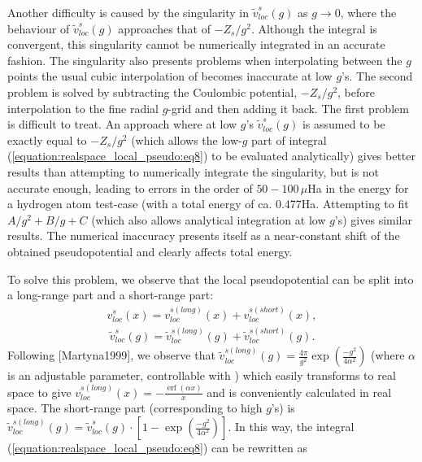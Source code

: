 \documentclass[letterpaper,10pt,english]{sphinxmanual}
\begin{document}
Another difficulty is caused by the singularity in
\({\tilde{v}^s_{loc}\left(g\right)}\) as \(g\to0\), where the
behaviour of \({\tilde{v}^s_{loc}\left(g\right)}\) approaches that
of \(-Z_s/g^2\). Although the integral is convergent, this
singularity cannot be numerically integrated in an accurate fashion. The
singularity also presents problems when interpolating between the
\(g\) points \textendash{} the usual cubic interpolation of
 becomes inaccurate at low \(g\)’s.
The second problem is solved by subtracting the Coulombic potential,
\(-Z_s/g^2\), before interpolation to the fine radial \(g\)-grid
and then adding it back. The first problem is difficult to treat. An
approach where at low \(g\)’s
\({\tilde{v}^s_{loc}\left(g\right)}\) is assumed to be exactly equal
to \(-Z_s/g^2\) (which allows the low-\(g\) part of integral
(\eqref{equation:realspace_local_pseudo:eq8}) to be evaluated analytically) gives better results than
attempting to numerically integrate the singularity, but is not accurate
enough, leading to errors in the order of \(50-100\,\mu{}\)Ha in
the energy for a hydrogen atom test-case (with a total energy of ca.
0.477Ha. Attempting to fit \(A/g^2+B/g+C\) (which also allows
analytical integration at low \(g\)’s) gives similar results. The
numerical inaccuracy presents itself as a near-constant shift of the
obtained pseudopotential and clearly affects total energy.

To solve this problem, we observe that the local pseudopotential can be
split into a long-range part and a short-range part:
\begin{equation*}
\begin{split}{v^s_{loc}\left(x\right)}= {v^{s (long)}_{loc}\left(x\right)}+ {v^{s (short)}_{loc}\left(x\right)},\end{split}
\end{equation*}\begin{equation*}
\begin{split}{\tilde{v}^s_{loc}\left(g\right)}= {\tilde{v}^{s (long)}_{loc}\left(g\right)}+ {\tilde{v}^{s (short)}_{loc}\left(g\right)}.\end{split}
\end{equation*}
Following {[}Martyna1999{]}, we observe that
\({\tilde{v}^{s (long)}_{loc}\left(g\right)}=\frac{4\pi}{g^2}\exp{\left(\frac{-g^2}{4\alpha^2}\right)}\)
(where \(\alpha\) is an adjustable parameter, controllable with
) which easily transforms to real space
to give
\({v^{s (long)}_{loc}\left(x\right)}=-\frac{\operatorname{erf}{\left(\alpha{}x\right)}}{x}\)
and is conveniently calculated in real space. The short-range part
(corresponding to high \(g\)’s) is
\({\tilde{v}^{s (long)}_{loc}\left(g\right)}={\tilde{v}^s_{loc}\left(g\right)}\cdot\left[1-\exp{\left(\frac{-g^2}{4\alpha^2}\right)}\right]\).
In this way, the integral (\eqref{equation:realspace_local_pseudo:eq8}) can be rewritten as
\end{document}
